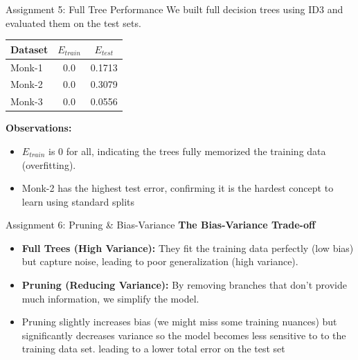 \documentclass{beamer}
\begin{document}
\begin{frame}{Assignment 5: Full Tree Performance}
    We built full decision trees using ID3 and evaluated them on the test sets.

    \begin{table}[]
        \centering
        \begin{tabular}{lcc}
        \toprule
        \textbf{Dataset} & \textbf{$E_{train}$} & \textbf{$E_{test}$} \\
        \midrule
        Monk-1 & 0.0 & 0.1713 \\
        Monk-2 & 0.0 & 0.3079 \\
        Monk-3 & 0.0 & 0.0556 \\
        \bottomrule
        \end{tabular}
    \end{table}
    
    \textbf{Observations:}
    \begin{itemize}
        \item $E_{train}$ is 0 for all, indicating the trees fully memorized the training data (overfitting).
        \item Monk-2 has the highest test error, confirming it is the hardest concept to learn using standard splits
    \end{itemize}
\end{frame}

\begin{frame}{Assignment 6: Pruning \& Bias-Variance}
    \textbf{The Bias-Variance Trade-off} \\
    \begin{itemize}
        \item \textbf{Full Trees (High Variance):} They fit the training data perfectly (low bias) but capture noise, 
            leading to poor generalization (high variance).
        \item \textbf{Pruning (Reducing Variance):} By removing branches that don't provide much information, we simplify the model.
        \item Pruning slightly increases bias (we might miss some training nuances) but significantly decreases variance so the model becomes less sensitive to to the training data set.
            leading to a lower total error on the test set
    \end{itemize}
\end{frame}
\end{document}
